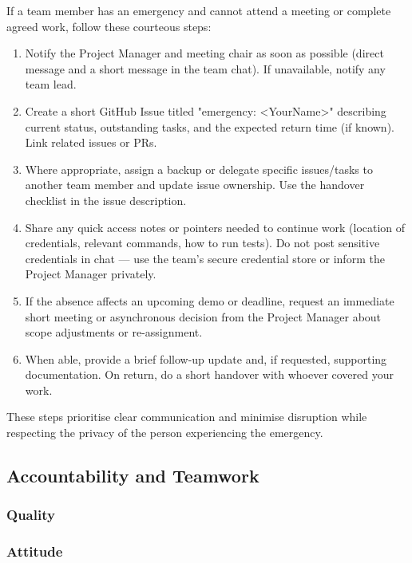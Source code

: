 \documentclass{article}
\begin{document}
If a team member has an emergency and cannot attend a meeting or complete agreed work, follow these courteous steps:
\begin{enumerate}
  \item Notify the Project Manager and meeting chair as soon as possible (direct message and a short message in the team chat). If unavailable, notify any team lead.
  \item Create a short GitHub Issue titled "emergency: <YourName>" describing current status, outstanding tasks, and the expected return time (if known). Link related issues or PRs.
  \item Where appropriate, assign a backup or delegate specific issues/tasks to another team member and update issue ownership. Use the handover checklist in the issue description.
  \item Share any quick access notes or pointers needed to continue work (location of credentials, relevant commands, how to run tests). Do not post sensitive credentials in chat — use the team's secure credential store or inform the Project Manager privately.
  \item If the absence affects an upcoming demo or deadline, request an immediate short meeting or asynchronous decision from the Project Manager about scope adjustments or re-assignment.
  \item When able, provide a brief follow-up update and, if requested, supporting documentation. On return, do a short handover with whoever covered your work.
\end{enumerate}

These steps prioritise clear communication and minimise disruption while respecting the privacy of the person experiencing the emergency.

\subsection*{Accountability and Teamwork}

\subsubsection*{Quality} 


\subsubsection*{Attitude}
\end{document}
